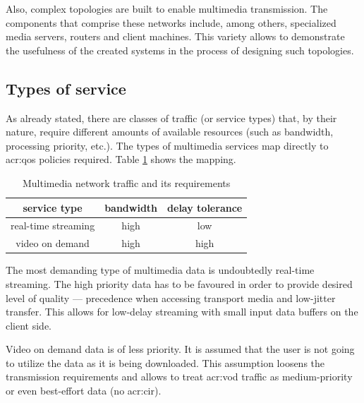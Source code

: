 \documentclass[11pt]{book}
\begin{document}
      Also, complex topologies are built to enable multimedia transmission. The components that comprise these networks
      include, among others, specialized media servers, routers and client machines. This variety allows to demonstrate
      the usefulness of the created systems in the process of designing such topologies.


      \subsection{Types of service}
      
        As already stated, there are classes of traffic (or service types) that, by their nature, require different
        amounts of available resources (such as bandwidth, processing priority, etc.). The types of multimedia services
        map directly to \gls{acr:qos} policies required. Table \ref{tab:uc:qos} shows the mapping.

        \begin{table}[H]
          \begin{center}
            \begin{tabular}{|c|c|c|}
              \hline
              service type        & bandwidth & delay tolerance \\
              \hline \hline
              real-time streaming & high      & low \\
              \hline
              video on demand     & high      & high  \\
              \hline
            \end{tabular}
          \end{center}


          \caption{Multimedia network traffic and its requirements}
          \label{tab:uc:qos}
        \end{table}

        The most demanding type of multimedia data is undoubtedly real-time streaming. The high priority data has to be
        favoured in order to provide desired level of quality --- precedence when accessing transport media and
        low-jitter transfer. This allows for low-delay streaming with small input data buffers on the client side.

        Video on demand data is of less priority. It is assumed that the user is not going to utilize the data as it is
        being downloaded. This assumption loosens the transmission requirements and allows to treat \gls{acr:vod} traffic as
        medium-priority or even best-effort data (no \gls{acr:cir}).
\end{document}
